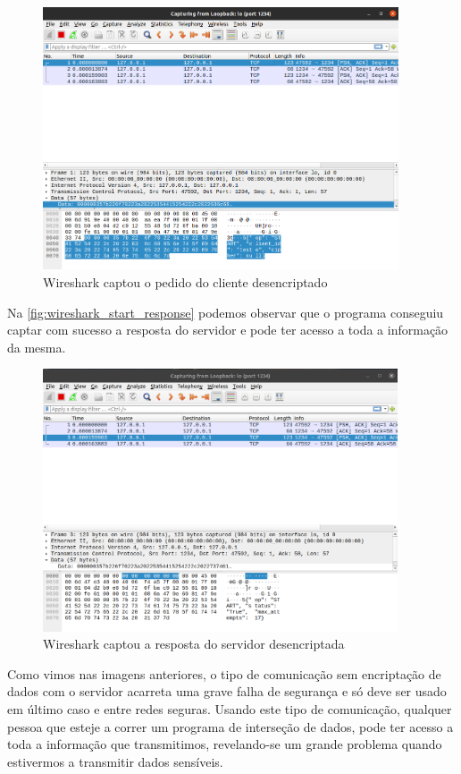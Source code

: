 \documentclass{report}
\begin{document}
\begin{figure}[!h]
\center 
\includegraphics[height=220pt]{img/non_encripted/wireshark_start_request.png}
\caption{Wireshark captou o pedido do cliente desencriptado}
\label{fig:wireshark_start_request}
\end{figure}

Na \autoref{fig:wireshark_start_response} podemos observar que o programa conseguiu captar com sucesso a resposta do servidor e pode ter acesso a toda a informação da mesma.

\begin{figure}[!h]
\center 
\includegraphics[height=220pt]{img/non_encripted/wireshark_start_response.png}
\caption{Wireshark captou a resposta do servidor desencriptada}
\label{fig:wireshark_start_response}
\end{figure}

Como vimos nas imagens anteriores, o tipo de comunicação sem encriptação de dados com o servidor acarreta uma grave falha de segurança e só deve ser usado em último caso e entre redes seguras. Usando este tipo de comunicação, qualquer pessoa que esteje a correr um programa de interseção de dados, pode ter acesso a toda a informação que transmitimos, revelando-se um grande problema quando estivermos a transmitir dados sensíveis.
\end{document}
